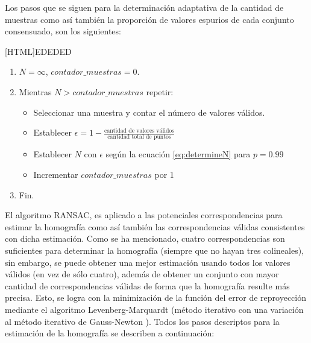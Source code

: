 Los pasos que se siguen para la determinación adaptativa de la cantidad de muestras como así también la proporción de valores espurios de cada conjunto consensuado, son los siguientes:

[HTML]{EDEDED}{\parbox{365pt}{%
\noindent %
\begin{enumerate}[nolistsep]
 \item $N=\infty$, $contador\_muestras=0$.
 \item Mientras $N>contador\_muestras$ repetir:
  \begin{itemize}
    \item Seleccionar una muestra y contar el número de valores válidos. 
    \item Establecer $\epsilon=1-\frac{\text{cantidad de valores válidos}}{\text{cantidad total de puntos}}$
    \item Establecer $N$ con $\epsilon$ según la ecuación \eqref{eq:determineN} para $p=0.99$
    \item Incrementar $contador\_muestras$ por 1
  \end{itemize}
 \item Fin.
\end{enumerate}}}

\smallskip
El algoritmo RANSAC, es aplicado a las potenciales correspondencias para estimar la homografía como así también las correspondencias válidas consistentes con dicha estimación. Como se ha mencionado, cuatro correspondencias son suficientes para determinar la homografía (siempre que no hayan tres colineales), sin embargo, se puede obtener una mejor estimación usando todos los valores válidos (en vez de sólo cuatro), además de obtener un conjunto con mayor cantidad de correspondencias válidas de forma que la homografía resulte más precisa. Esto, se logra con la minimización de la función del error de reproyección mediante el algoritmo Levenberg-Marquardt (método iterativo con una variación al método iterativo de Gauss-Newton \cite[p. 600]{Hartley2004}). Todos los pasos descriptos para la estimación de la homografía se describen a continuación:

